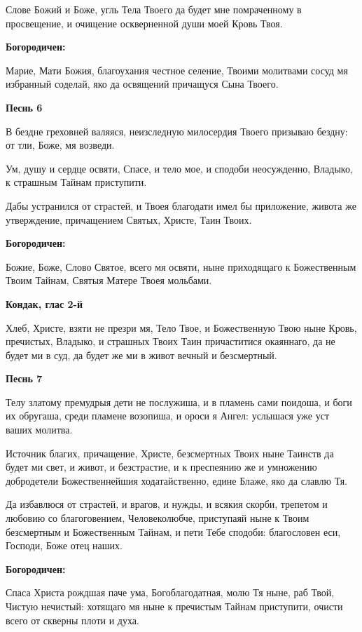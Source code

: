Слове Божий и Боже, угль Тела Твоего да будет мне помраченному в просвещение, и очищение оскверненной души моей Кровь Твоя.


\medskip
\bfseries Богородичен:\normalfont{}\nopagebreak

Марие, Мати Божия, благоухания честное селение, Твоими молитвами сосуд мя избранный соделай, яко да освящений причащуся Сына Твоего.


\medskip
\bfseries Песнь 6\normalfont{}\nopagebreak


В бездне греховней валяяся, неизследную милосердия Твоего призываю бездну: от тли, Боже, мя возведи.


Ум, душу и сердце освяти, Спасе, и тело мое, и сподоби неосужденно, Владыко, к страшным Тайнам приступити.


Дабы устранился от страстей, и Твоея благодати имел бы приложение, живота же утверждение, причащением Святых, Христе, Таин Твоих.


\medskip
\bfseries Богородичен:\normalfont{}\nopagebreak

Божие, Боже, Слово Святое, всего мя освяти, ныне приходящаго к Божественным Твоим Тайнам, Святыя Матере Твоея мольбами.


\medskip
\bfseries Кондак, глас 2-й\normalfont{}\nopagebreak


Хлеб, Христе, взяти не презри мя, Тело Твое, и Божественную Твою ныне Кровь, пречистых, Владыко, и страшных Твоих Таин причаститися окаяннаго, да не будет ми в суд, да будет же ми в живот вечный и безсмертный.


\medskip
\bfseries Песнь 7\normalfont{}\nopagebreak


Телу златому премудрыя дети не послужиша, и в пламень сами поидоша, и боги их обругаша, среди пламене возопиша, и ороси я Ангел: услышася уже уст ваших молитва.


Источник благих, причащение, Христе, безсмертных Твоих ныне Таинств да будет ми свет, и живот, и безстрастие, и к преспеянию же и умножению добродетели Божественнейшия ходатайственно, едине Блаже, яко да славлю Тя.


Да избавлюся от страстей, и врагов, и нужды, и всякия скорби, трепетом и любовию со благоговением, Человеколюбче, приступаяй ныне к Твоим безсмертным и Божественным Тайнам, и пети Тебе сподоби: благословен еси, Господи, Боже отец наших.


\medskip
\bfseries Богородичен:\normalfont{}\nopagebreak

Спаса Христа рождшая паче ума, Богоблагодатная, молю Тя ныне, раб Твой, Чистую нечистый: хотящаго мя ныне к пречистым Тайнам приступити, очисти всего от скверны плоти и духа.


